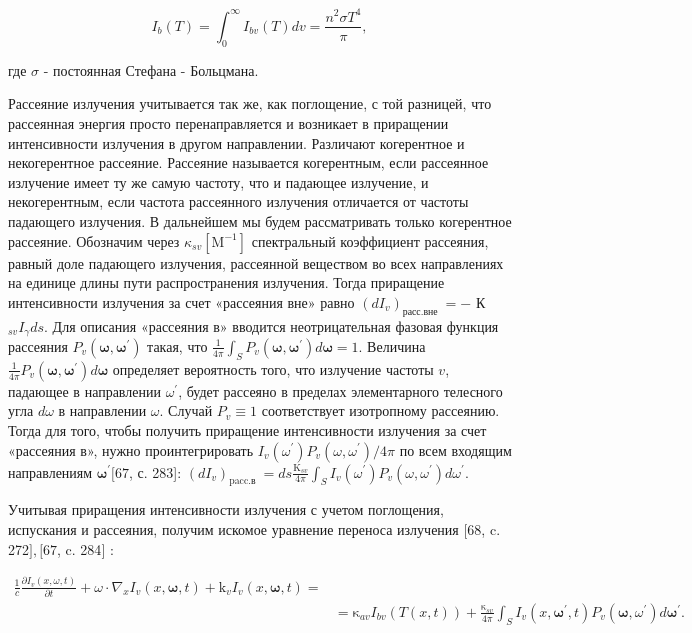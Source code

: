 \documentclass[10pt]{article}
\begin{document}
$$
I_{b}(T)=\int_{0}^{\infty} I_{b v}(T) d v=\frac{n^{2} \sigma T^{4}}{\pi},
$$

где $\sigma$ - постоянная Стефана - Больцмана.

Рассеяние излучения учитывается так же, как поглощение, с той разницей, что рассеянная энергия просто перенаправляется и возникает в приращении интенсивности излучения в другом направлении. Различают когерентное и некогерентное рассеяние. Рассеяние называется когерентным, если рассеянное излучение имеет ту же самую частоту, что и падающее излучение, и некогерентным, если частота рассеянного излучения отличается от частоты падающего излучения. В дальнейшем мы будем рассматривать только когерентное рассеяние. Обозначим через $\kappa_{s v}\left[\mathrm{M}^{-1}\right]$ спектральный коэффициент рассеяния, равный доле падающего излучения, рассеянной веществом во всех направлениях на единице длины пути распространения излучения. Тогда приращение интенсивности излучения за счет «рассеяния вне» равно $\left(d I_{v}\right)_{\text {расс.вне }}=-$ К $_{s v} I_{\gamma} d s$. Для описания «рассеяния в» вводится неотрицательная фазовая функция рассеяния $P_{v}\left(\boldsymbol{\omega}, \boldsymbol{\omega}^{\prime}\right)$ такая, что $\frac{1}{4 \pi} \int_{S} P_{v}\left(\boldsymbol{\omega}, \boldsymbol{\omega}^{\prime}\right) d \boldsymbol{\omega}=1$. Величина $\frac{1}{4 \pi} P_{v}\left(\boldsymbol{\omega}, \boldsymbol{\omega}^{\prime}\right) d \boldsymbol{\omega}$ определяет вероятность того, что излучение частоты $v$, падающее в направлении $\omega^{\prime}$, будет рассеяно в пределах элементарного телесного угла $d \omega$ в направлении $\omega$. Случай $P_{v} \equiv 1$ соответствует изотропному рассеянию. Тогда для того, чтобы получить приращение интенсивности излучения за счет «рассеяния в», нужно проинтегрировать $I_{v}\left(\omega^{\prime}\right) P_{v}\left(\omega, \omega^{\prime}\right) / 4 \pi$ по всем входящим направлениям $\boldsymbol{\omega}^{\prime}[67$, с. 283]: $\left(d I_{v}\right)_{\text {pacc.в }}=d s \frac{\mathrm{K}_{s v}}{4 \pi} \int_{S} I_{v}\left(\omega^{\prime}\right) P_{v}\left(\omega, \omega^{\prime}\right) d \omega^{\prime}$.

Учитывая приращения интенсивности излучения с учетом поглощения, испускания и рассеяния, получим искомое уравнение переноса излучения $[68$, c. 272$],[67$, c. 284$]$ :

$$
\begin{aligned}
\frac{1}{c} \frac{\partial I_{v}(x, \omega, t)}{\partial t}+\omega \cdot \nabla_{x} I_{v}(x, \boldsymbol{\omega}, t)+\mathrm{k}_{v} I_{v}(x, \boldsymbol{\omega}, t)=\\
&=\mathrm{\kappa}_{a v} I_{b v}(T(x, t))+\frac{\mathrm{\kappa}_{s v}}{4 \pi} \int_{S} I_{v}\left(x, \boldsymbol{\omega}^{\prime}, t\right) P_{v}\left(\boldsymbol{\omega}, \omega^{\prime}\right) d \boldsymbol{\omega}^{\prime} .
\end{aligned}
$$
\end{document}
